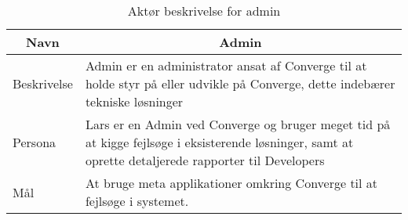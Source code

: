 \begin{table}[H]
    \begin{small}
        \caption{Aktør beskrivelse for admin}
        \label{tab:admin}
        \begin{center}
            \begin{tabular}[c]{l|l}
                \multicolumn{1}{c|}{\textbf{Navn}} & \multicolumn{1}{c}{\textbf{Admin}}                                                                                                                                              \\
                \hline
                Beskrivelse                        & \multicolumn{1}{p{10cm}}{Admin er en administrator ansat af Converge til at holde styr på eller udvikle på Converge, dette indebærer tekniske løsninger}                        \\
                \hline
                Persona                            & \multicolumn{1}{p{10cm}}{Lars er en Admin ved Converge og bruger meget tid på at kigge fejlsøge i eksisterende løsninger, samt at oprette detaljerede rapporter til Developers} \\
                \hline
                Mål                                & \multicolumn{1}{p{10cm}}{At bruge meta applikationer omkring Converge til at fejlsøge i systemet.}                                                                              \\
            \end{tabular}
        \end{center}
    \end{small}
\end{table}

